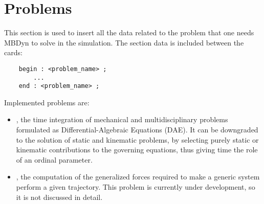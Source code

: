 %
%
%
%
%
% 
%
%

\chapter{Problems}\label{sec:PROBLEMS}
This section is used to insert all the data related to the problem that
one needs MBDyn to solve in the simulation.
The section data is included between the cards:
\begin{verbatim}
    begin : <problem_name> ;
        ...
    end : <problem_name> ;
\end{verbatim}

Implemented problems are:
\begin{itemize}
\item {}, the time integration of mechanical
and multidisciplinary problems formulated
as Differential-Algebraic Equations (DAE).
It can be downgraded to the solution of static and kinematic problems,
by selecting purely static or kinematic contributions
to the governing equations, thus giving time the role
of an ordinal parameter.

\item {}, the computation of the generalized forces
required to make a generic system perform a given trajectory.
This problem is currently under development, so it is not discussed
in detail.

\end{itemize}





